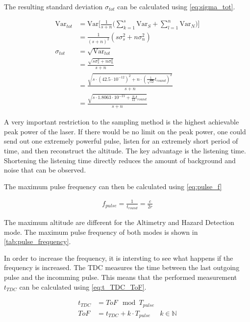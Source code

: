 The resulting standard deviation $\sigma_{tot}$ can be calculated using \cref{eq:sigma_tot}.

\begin{align}
\text{Var}_{tot} &= \text{Var}\Big[\frac{1}{s+n}\Big(\sum_{k=1}^s\text{Var}_S+\sum_{l=1}^n\text{Var}_N\Big)\Big]\\
&= \frac{1}{(s+n)^2}(s\sigma_s^2+n\sigma_n^2)\\
\sigma_{tot} &= \sqrt{\text{Var}_{tot}}\\
&= \frac{\sqrt{s\sigma_s^2+n\sigma_n^2}}{s+n} \\
&= \frac{\sqrt{s\cdot(42.5\cdot10^{-12})^2+n\cdot(\frac{1}{\sqrt{12}}t_{round})^2}}{s+n} \\
&= \frac{\sqrt{s\cdot1.8063\cdot10^{-21}+\frac{n}{12}t_{round}}}{s+n} \label{eq:sigma_tot}
\end{align}



A very important restriction to the sampling method is the highest achievable peak power of the laser. If there would be no limit on the peak power, one could send out one extremely powerful pulse, listen for an extremely short period of time, and then reconstruct the altitude. The key advantage is the listening time. Shortening the listening time directly reduces the amount of background and noise that can be observed.  




The maximum pulse frequency can then be calculated using \cref{eq:pulse_f}

\begin{align}\label{eq:pulse_f}
f_{pulse} = \frac{1}{t_{round}} = \frac{c}{2r}
\end{align}



The maximum altitude are different for the Altimetry and Hazard Detection mode. The maximum pulse frequency of both modes is shown in \cref{tab:pulse_frequency}.

%

In order to increase the frequency, it is intersting to see what happens if the frequency is increased. The TDC measures the time between the last outgoing pulse and the incomming pulse. This means that the performed measurement $t_{TDC}$ can be calculated using \cref{eq:t_TDC_ToF}.

\begin{align}\label{eq:t_TDC_ToF}
	t_{TDC} &=ToF \mod T_{pulse}\\	
	ToF &= t_{TDC}+k\cdot T_{pulse} & k \in \mathbb{N}\label{eq:ToF_t_TDC}
\end{align}

